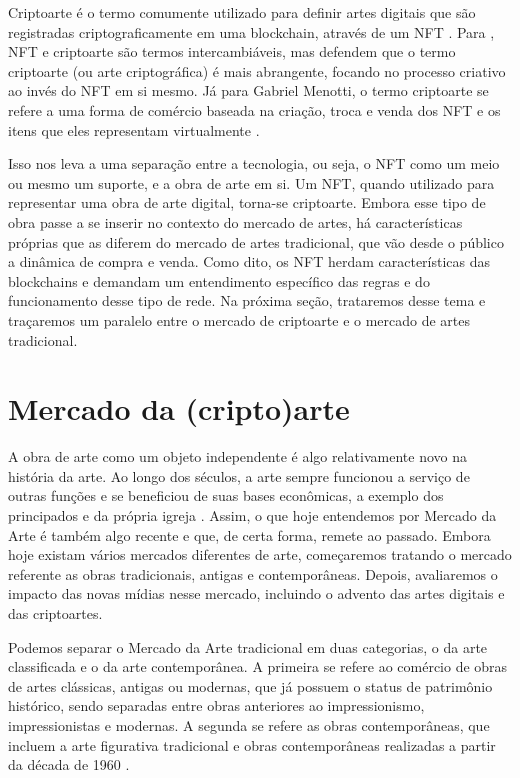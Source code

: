 Criptoarte é o termo comumente utilizado para definir artes digitais que são registradas criptograficamente em uma blockchain, através de um NFT \cite{Rkain, Jung}. Para , NFT e criptoarte são termos intercambiáveis, mas defendem que o termo criptoarte (ou arte criptográfica) é mais abrangente, focando no processo criativo ao invés do NFT em si mesmo. Já para Gabriel Menotti, o termo criptoarte se refere a uma forma de comércio baseada na criação, troca e venda dos NFT e os itens que eles representam virtualmente \cite{Menotti}.	

Isso nos leva a uma separação entre a tecnologia, ou seja, o NFT como um meio ou mesmo um suporte, e a obra de arte em si. Um NFT, quando utilizado para representar uma obra de arte digital, torna-se criptoarte. Embora esse tipo de obra passe a se inserir no contexto do mercado de artes, há características próprias que as diferem do mercado de artes tradicional, que vão desde o público a dinâmica de compra e venda. Como dito, os NFT herdam características das blockchains e demandam um entendimento específico das regras e do funcionamento desse tipo de rede. Na próxima seção, trataremos desse tema e traçaremos um paralelo entre o mercado de criptoarte e o mercado de artes tradicional.


\section{Mercado da (cripto)arte}
\label{sec:mercado de arte}

A obra de arte como um objeto independente é algo relativamente novo na história da arte. Ao longo dos séculos, a arte sempre funcionou a serviço de outras funções e se beneficiou de suas bases econômicas, a exemplo dos principados e da própria igreja \cite{Greffe}. Assim, o que hoje entendemos por Mercado da Arte é também algo recente e que, de certa forma, remete ao passado. Embora hoje existam vários mercados diferentes de arte, começaremos tratando o mercado referente as obras tradicionais, antigas e contemporâneas. Depois, avaliaremos o impacto das novas mídias nesse mercado, incluindo o advento das artes digitais e das criptoartes.

Podemos separar o Mercado da Arte tradicional em duas categorias, o da arte classificada e o da arte contemporânea. A primeira se refere ao comércio de obras de artes clássicas, antigas ou modernas, que já possuem o status de patrimônio histórico, sendo separadas entre obras anteriores ao impressionismo, impressionistas e modernas. A segunda se refere as obras contemporâneas, que incluem a arte figurativa tradicional e obras contemporâneas realizadas a partir da década de 1960 \cite{Moulin}. 

